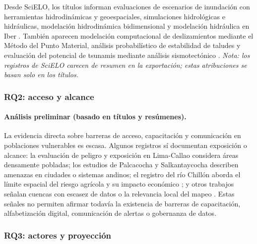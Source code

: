 \documentclass[12pt,a4paper]{article}
\begin{document}
Desde SciELO, los títulos informan evaluaciones de escenarios de inundación con herramientas hidrodinámicas y geoespaciales, simulaciones hidrológicas e hidráulicas, modelación hidrodinámica bidimensional y modelación hidráulica en Iber \parencite{snchezpineda2025evaluaci, rojasguerrero2025lisis, la2025modelizaci, gutirrezgarca2022modelaci}. También aparecen modelación computacional de deslizamientos mediante el Método del Punto Material, análisis probabilístico de estabilidad de taludes y evaluación del potencial de tsunamis mediante análisis sismotectónico \parencite{lemus2024modelaci, ariasvalencia2024lisis, zamora2021evaluaci}. \textit{Nota: los registros de SciELO carecen de resumen en la exportación; estas atribuciones se basan solo en los títulos.}

\subsubsection{RQ2: acceso y alcance}
\label{sec:rq2}
\paragraph*{Análisis preliminar (basado en títulos y resúmenes).}
La evidencia directa sobre barreras de acceso, capacitación y comunicación en poblaciones vulnerables es escasa. Algunos registros sí documentan exposición o alcance: la evaluación de peligro y exposición en Lima-Callao \parencite{quesquen2025tsunami, androsov2024nonlinear, garcia2025parallel} considera áreas densamente pobladas; los estudios de Palcacocha y Salkantaycocha \parencite{stuartsmith2021increased, vilca2021glacial} describen amenazas en ciudades o sistemas andinos; el registro del río Chillón aborda el límite espacial del riesgo agrícola y su impacto económico \parencite{lpezsilva2025spatial}; y otros trabajos señalan cuencas con escasez de datos o la relevancia local del mapeo \parencite{marin2021assessing, kuchinski2025regional}. Estas señales no permiten afirmar todavía la existencia de barreras de capacitación, alfabetización digital, comunicación de alertas o gobernanza de datos.

\subsubsection{RQ3: actores y proyección}
\label{sec:rq3}
\end{document}

